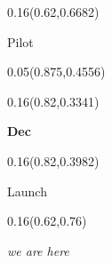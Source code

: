\documentclass[aspectratio=169]{beamer}
\begin{document}
\begin{frame}[t]
\begin{textblock}{0.16}(0.62,0.6682)
{\centering\fontsize{13}{16}\selectfont \textcolor[HTML]{333333}{Pilot}\par}
\end{textblock}

%
%
\begin{textblock}{0.05}(0.875,0.4556)
\end{textblock}

\begin{textblock}{0.16}(0.82,0.3341)
{\centering\fontsize{16}{19}\selectfont \textcolor[HTML]{2E6B30}{\textbf{Dec}}\par}
\end{textblock}

\begin{textblock}{0.16}(0.82,0.3982)
{\centering\fontsize{13}{16}\selectfont \textcolor[HTML]{333333}{Launch}\par}
\end{textblock}

\begin{textblock}{0.16}(0.62,0.76)
{\centering\fontsize{12}{14}\selectfont \textcolor[HTML]{B8860B}{\textit{we are here}}\par}
\end{textblock}
\end{frame}
\end{document}
